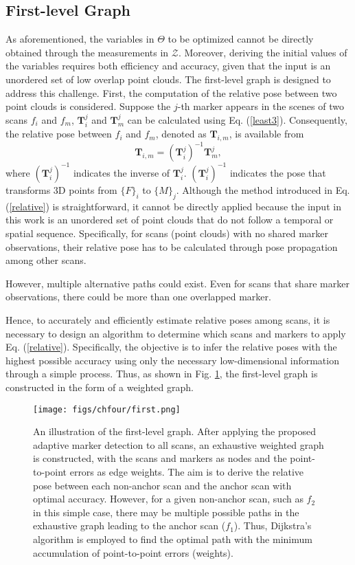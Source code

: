 \subsection{First-level Graph} \label{1level}
As aforementioned, the variables in $\Theta$ to be optimized cannot be directly obtained through the measurements in $\mathcal{Z}$. Moreover, deriving the initial values of the variables requires both efficiency and accuracy, given that the input is an unordered set of low overlap point clouds. 
%
The first-level graph is designed to address this challenge. First, the computation of the relative pose between two point clouds is considered. Suppose the $j$-th marker appears in the scenes of two scans $f_{i}$ and $f_{m}$, $\mathbf{T}^{j}_{i}$ and $\mathbf{T}^{j}_{m}$ can be calculated using Eq. (\ref{least3}). Consequently, the relative pose between $f_{i}$ and $f_{m}$, denoted as $\mathbf{T}_{i,m}$, is available from
 \begin{equation}	
	\mathbf{T}_{i,m}=(\mathbf{T}^{j}_{i})^{-1} \mathbf{T}^{j}_{m},\label{relative}
\end{equation}
where $(\mathbf{T}^{j}_{i})^{-1}$ indicates the inverse of $\mathbf{T}^{j}_{i}$. $(\mathbf{T}^{j}_{i})^{-1}$ indicates the pose that transforms 3D points from $\{F\}_{i}$ to $\{M\}_{j}$. Although the method introduced in Eq. (\ref{relative}) is straightforward, it cannot be directly applied because the input in this work is an unordered set of point clouds that do not follow a temporal or spatial sequence.
%
Specifically, for scans (point clouds) with no shared marker observations, their relative pose has to be calculated through pose propagation among other scans.
\par
However, multiple alternative paths could exist. Even for scans that share marker observations, there could be more than one overlapped marker. 
\par
Hence, to accurately and efficiently estimate relative poses among scans, it is necessary to design an algorithm to determine which scans and markers to apply Eq. (\ref{relative}). Specifically, the objective is to infer the relative poses with the highest possible accuracy using only the necessary low-dimensional information through a simple process. 
%
Thus, as shown in Fig. \ref{firstlevel}, the first-level graph is constructed in the form of a weighted graph. 
\begin{figure}[H] 
	\centering
\texttt{[image: figs/chfour/first.png]}
	\caption{An illustration of the first-level graph.
    After applying the proposed adaptive marker detection to all scans, an exhaustive weighted graph is constructed, with the scans and markers as nodes and the point-to-point errors as edge weights.
    The aim is to derive the relative pose between each non-anchor scan and the anchor scan with optimal accuracy.
    However, for a given non-anchor scan, such as $f_{2}$ in this simple case, there may be multiple possible paths in the exhaustive graph leading to the anchor scan ($f_{1}$).
    Thus, Dijkstra’s algorithm \cite{dij} is employed to find the optimal path with the minimum accumulation of point-to-point errors (weights).}
	\label{firstlevel}
\end{figure}

